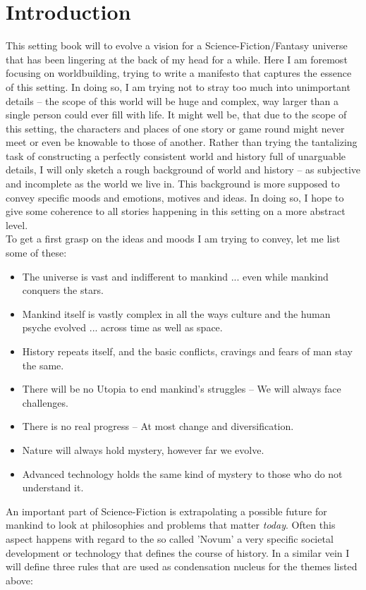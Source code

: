 \chapter{Introduction}

This setting book will to evolve a vision for a Science-Fiction/Fantasy
universe that has been lingering at the back of my head for a while. Here I am
foremost focusing on worldbuilding, trying to write a manifesto that captures
the essence of this setting. In doing so, I am trying not to stray too much
into unimportant details -- the scope of this world will be huge and complex,
way larger than a single person could ever fill with life.
It might well be, that due to the scope of this setting, the characters and
places of one story or game round might never meet or even be knowable to those
of another. Rather than trying the tantalizing task of constructing a perfectly
consistent world and history full of unarguable details, I will only sketch a
rough background of world and history -- as subjective and incomplete as the
world we live in.
This background is more supposed to convey specific moods and emotions, motives
and ideas. In doing so, I hope to give some coherence to all stories happening
in this setting on a more abstract level.\\

To get a first grasp on the ideas and moods I am trying to convey, let me list
some of these:

\begin{itemize}
\item The universe is vast and indifferent to mankind ... even while mankind
conquers the stars.
\item Mankind itself is vastly complex in all the ways culture and the human
psyche evolved ... across time as well as space.
\item History repeats itself, and the basic conflicts, cravings and fears of man
stay the same.
\item There will be no Utopia to end mankind's struggles -- We will always face
challenges.
\item There is no real progress -- At most change and diversification.
\item Nature will always hold mystery, however far we evolve.
\item Advanced technology holds the same kind of mystery to those who do not
understand it.
\end{itemize}

An important part of Science-Fiction is extrapolating a possible future for
mankind to look at philosophies and problems that matter \emph{today}. Often
this aspect happens with regard to the so called 'Novum' a very specific societal
development or technology that defines the course of history. In a similar vein
I will define three rules that are used as condensation nucleus for the themes
listed above:

